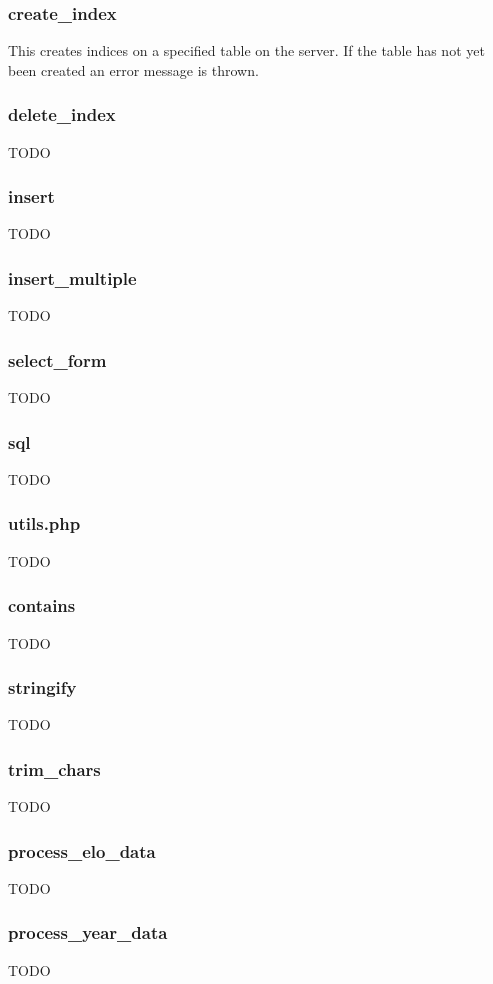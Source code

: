 \documentclass{article}
\begin{document}
\subsubsection*{create\_index}
This creates indices on a specified table on the server. If the table has not yet been created an error message is thrown.

\subsubsection*{delete\_index}
TODO
\subsubsection*{insert}
TODO
\subsubsection*{insert\_multiple}
TODO
\subsubsection*{select\_form}
TODO
\subsubsection*{sql}
TODO

\subsubsection{utils.php}
TODO

\subsubsection*{contains}
TODO

\subsubsection*{stringify}
TODO


\subsubsection*{trim\_chars}
TODO


\subsubsection*{process\_elo\_data}
TODO


\subsubsection*{process\_year\_data}
TODO
\end{document}
